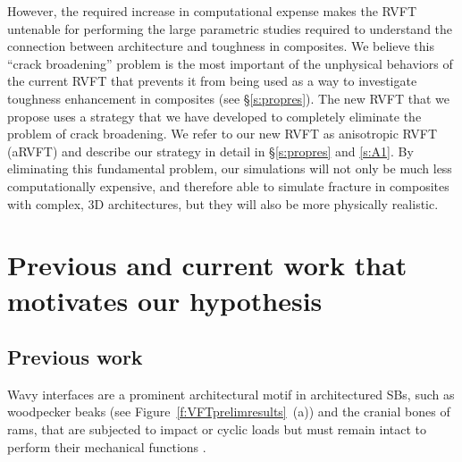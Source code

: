 \documentclass[10pt,letterpaper]{article}
\begin{document}
    However, the required increase in computational expense makes the RVFT untenable for performing the large parametric studies required to understand the connection between architecture and toughness in composites. We believe this ``crack broadening'' problem is the most important of the unphysical behaviors of the current RVFT that prevents it from being used as a way to investigate toughness enhancement in composites (see \S \ref{s:propres}). The new RVFT that we propose uses a strategy that we have developed to completely eliminate the problem of crack broadening. We refer to our new RVFT as anisotropic RVFT (aRVFT) and describe our strategy in detail in \S \ref{s:propres} and \ref{s:A1}. By eliminating this fundamental problem, our simulations will not only be much less computationally expensive, and therefore able to simulate fracture in composites with complex, 3D architectures, but they will also be more physically realistic.

\section{Previous and current work that motivates our hypothesis}
  \label{s:prevcurr}

  \subsection{Previous work}
    \label{s:prev}
    Wavy interfaces are a prominent architectural motif in architectured SBs, such as woodpecker beaks (see Figure~\ref{f:VFTprelimresults}~(a)) and the cranial bones of rams, that are subjected to impact or cyclic loads but must remain intact to perform their mechanical functions \cite{lee2014hierarchical, jaslow1990mechanical}.
\end{document}
